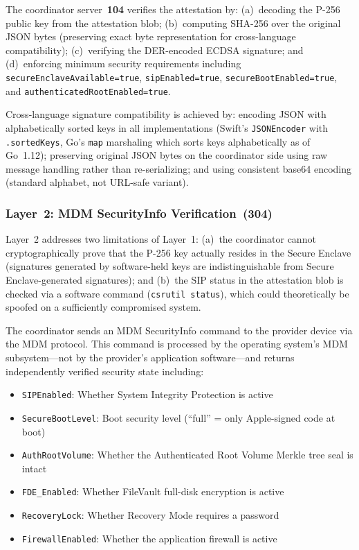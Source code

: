 \documentclass[11pt,letterpaper]{article}
\begin{document}
The coordinator server~\textbf{104} verifies the attestation by: (a)~decoding the P-256 public key from the attestation blob; (b)~computing SHA-256 over the original JSON bytes (preserving exact byte representation for cross-language compatibility); (c)~verifying the DER-encoded ECDSA signature; and (d)~enforcing minimum security requirements including \texttt{secureEnclaveAvailable=true}, \texttt{sipEnabled=true}, \texttt{secureBootEnabled=true}, and \texttt{authenticatedRootEnabled=true}.

Cross-language signature compatibility is achieved by: encoding JSON with alphabetically sorted keys in all implementations (Swift's \texttt{JSONEncoder} with \texttt{.sortedKeys}, Go's \texttt{map} marshaling which sorts keys alphabetically as of Go~1.12); preserving original JSON bytes on the coordinator side using raw message handling rather than re-serializing; and using consistent base64 encoding (standard alphabet, not URL-safe variant).

\subsubsection{Layer~2: MDM SecurityInfo Verification~(304)}

Layer~2 addresses two limitations of Layer~1: (a)~the coordinator cannot cryptographically prove that the P-256 key actually resides in the Secure Enclave (signatures generated by software-held keys are indistinguishable from Secure Enclave-generated signatures); and (b)~the SIP status in the attestation blob is checked via a software command (\texttt{csrutil status}), which could theoretically be spoofed on a sufficiently compromised system.

The coordinator sends an MDM SecurityInfo command to the provider device via the MDM protocol. This command is processed by the operating system's MDM subsystem---not by the provider's application software---and returns independently verified security state including:

\begin{itemize}[nosep]
\item \texttt{SIPEnabled}: Whether System Integrity Protection is active
\item \texttt{SecureBootLevel}: Boot security level (``full'' = only Apple-signed code at boot)
\item \texttt{AuthRootVolume}: Whether the Authenticated Root Volume Merkle tree seal is intact
\item \texttt{FDE\_Enabled}: Whether FileVault full-disk encryption is active
\item \texttt{RecoveryLock}: Whether Recovery Mode requires a password
\item \texttt{FirewallEnabled}: Whether the application firewall is active
\end{itemize}
\end{document}
